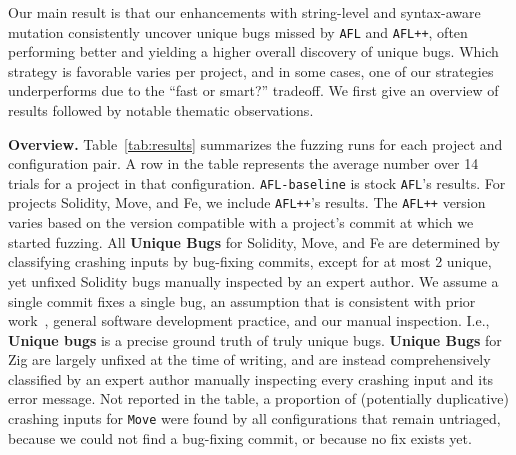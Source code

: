Our main result is that our enhancements with string-level and syntax-aware
mutation consistently uncover unique bugs missed by \texttt{AFL} and
\texttt{AFL++}, often performing better and yielding a higher overall discovery
of unique bugs. Which strategy is favorable varies per project, and in some
cases, one of our strategies underperforms due to the ``fast or smart?''
tradeoff. We first give an overview of results followed by notable
thematic observations.

\noindent \textbf{Overview.} Table~\ref{tab:results} summarizes the fuzzing
runs for each project and configuration pair. A row in the table represents the
average number over 14 trials for a project in that configuration.
\texttt{AFL-baseline} is stock \texttt{AFL}'s results. For projects Solidity,
Move, and Fe, we include \texttt{AFL++}'s results. The \texttt{AFL++} version
varies based on the version compatible with a project's commit at which we
started fuzzing. All \textbf{Unique Bugs} for Solidity, Move, and Fe are
determined by classifying crashing inputs by bug-fixing commits, except for at
most 2 unique, yet unfixed Solidity bugs manually inspected by an expert
author. We assume a single commit fixes a single bug, an assumption that is
consistent with prior work~\cite{semantic-crash-bucketing,Taming}, general
software development practice, and our manual inspection. I.e., \textbf{Unique
bugs} is a precise ground truth of truly unique bugs. \textbf{Unique Bugs} for
Zig are largely unfixed at the time of writing, and are instead comprehensively
classified by an expert author manually inspecting every crashing input and its
error message. Not reported in the table, a proportion of (potentially
duplicative) crashing inputs for \texttt{Move} were found by all configurations
that remain untriaged, because we could not find a bug-fixing commit, or
because no fix exists yet.

